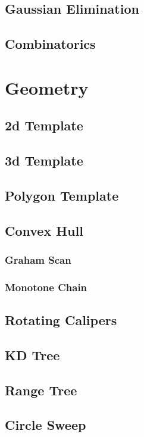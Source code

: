 \documentclass[10pt,a4paper]{report}
\begin{document}
	\section{Gaussian Elimination}
	
	\section{Combinatorics}
	
\chapter{Geometry}
	\section{2d Template}
	\section{3d Template}
	\section{Polygon Template}
	\section{Convex Hull}
		\subsection{Graham Scan}
		\subsection{Monotone Chain}
	\section{Rotating Calipers}
	\section{KD Tree}
	\section{Range Tree}
	\section{Circle Sweep}
	
\end{document}
